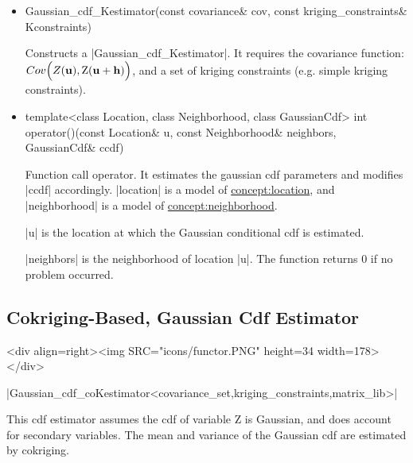\documentclass[12pt,twoside]{report}
\newcommand{\mloc}[1]{\rm{\bf #1}}
\begin{document}
\begin{itemize}

\item
 \begin{code} 
Gaussian_cdf_Kestimator(const covariance& cov,
                        const kriging_constraints& Kconstraints)
\end{code}

Constructs a |Gaussian_cdf_Kestimator|. It requires the covariance function: $Cov \Big( Z(\mloc{u}),Z(\mloc{u}+\mloc{h}) \Big)$, and a set of kriging constraints (e.g. simple kriging constraints). 


\item
 \begin{code}
template<class Location, class Neighborhood, class GaussianCdf> 
int operator()(const Location& u, const Neighborhood& neighbors,
               GaussianCdf& ccdf)
  \end{code}

Function call operator. It estimates the gaussian cdf parameters and modifies |ccdf| accordingly. 
|location| is a model of \hyperref{Location}{Location (see Section}{)}{concept:location}, and |neighborhood| is a model of \hyperref{Neighborhood}{Neighborhood (see Section}{)}{concept:neighborhood}. 

|u| is the location at which the Gaussian conditional cdf is estimated. 

|neighbors| is the neighborhood of location |u|.
The function returns 0 if no problem occurred. 
\end{itemize}









\subsection{Cokriging-Based, Gaussian Cdf Estimator}
\begin{htmlonly}
<div align=right><img SRC="icons/functor.PNG" height=34 width=178></div>
\end{htmlonly}

|Gaussian_cdf_coKestimator<covariance_set,kriging_constraints,matrix_lib>|
\vspace{0.3cm}


This cdf estimator assumes the cdf of variable Z is Gaussian, and does account for secondary variables. The mean and variance of the Gaussian cdf are estimated by cokriging.
\end{document}
